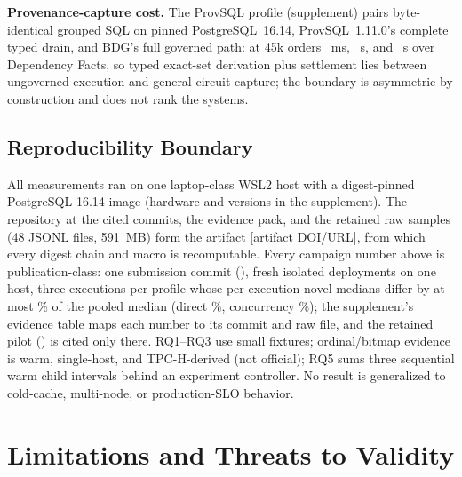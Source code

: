 \documentclass[10pt,journal,compsoc]{IEEEtran}
\begin{document}
\textbf{Provenance-capture cost.} The ProvSQL profile (supplement) pairs
byte-identical grouped SQL on pinned PostgreSQL~16.14, ProvSQL~1.11.0's
complete typed drain, and BDG's full governed path: at 45k orders
\FinalVFivePublicationProvSQLFortyFiveKPostgreSQLMS{}~ms,
\FinalVFivePublicationProvSQLFortyFiveKProvSQLS{}~s, and
\FinalVFivePublicationProvSQLFortyFiveKBDGS{}~s over
\FinalVFivePublicationProvSQLFortyFiveKDependencyFacts{} Dependency Facts,
so typed exact-set derivation plus settlement lies between ungoverned
execution and general circuit capture; the boundary is asymmetric by
construction and does not rank the systems.

\subsection{Reproducibility Boundary}

All measurements ran on one laptop-class WSL2 host with a digest-pinned
PostgreSQL 16.14 image (hardware and versions in the supplement). The
repository at the
cited commits, the evidence pack, and the retained raw samples (48 JSONL
files, 591~MB) form the artifact [artifact DOI/URL], from which every digest
chain and macro is recomputable. Every campaign number above is
publication-class: one submission commit (\FinalVFivePublicationCommit{}),
\FinalVFivePublicationDeployments{} fresh isolated deployments on one host,
three executions per profile whose per-execution novel medians differ by at
most \FinalVFivePublicationNovelSpreadMaxPct\% of the pooled median (direct
\FinalVFivePublicationDirectSpreadMaxPct\%, concurrency
\FinalVFivePublicationConcurrencySpreadMaxPct\%); the supplement's evidence
table maps each number to its commit and raw file, and the retained pilot
(\FinalVFivePilotArtifactCommit{}) is cited only there. RQ1--RQ3 use small
fixtures; ordinal/bitmap evidence is warm, single-host, and TPC-H-derived
(not official); RQ5 sums three sequential warm child intervals behind an
experiment controller. No result is generalized to cold-cache, multi-node,
or production-SLO behavior.

\section{Limitations and Threats to Validity}
\label{sec:limits}
\end{document}

